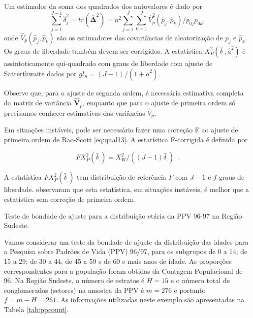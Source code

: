\documentclass[]{book}
\theoremstyle{definition}
\theoremstyle{definition}
\theoremstyle{definition}
\theoremstyle{remark}
\let\BeginKnitrBlock\begin \let\EndKnitrBlock\end
\begin{document}
Um estimador da soma dos quadrados dos autovalores é dado por \[
\sum_{j=1}^{J-1}\hat{\delta}_{j}^{2}=tr\left( \mathbf{\hat{\Delta}}^{2}\right) =n^{2}\sum\limits_{j=1}^{J}\sum\limits_{k=1}^{J}
\hat{V}_{p}^{2}\left( \hat{p}_{j},\hat{p}_{k}\right) /p_{0j}p_{0k}, 
\] onde \(\hat{V}_{p}\left( \hat{p}_{j},\hat{p}_{k}\right)\) são os
estimadores das covariâncias de aleatorização de \(\hat{p}_{j}\) e
\(\hat{p}_{k}\). Os graus de liberdade também devem ser corrigidos. A
estatística \(X_{P}^{2}\left( \hat{\delta}_{.},\hat{a}^{2}\right)\) é
assintoticamente qui-quadrado com graus de liberdade com ajuste de
Satterthwaite dados por
\(gl_{S}=\left( J-1\right) /\left( 1+\hat{a}^{2}\right)\).

Observe que, para o ajuste de segunda ordem, é necessária estimativa
completa da matriz de variância \(\mathbf{\hat{V}}_{p}\), enquanto que
para o ajuste de primeira ordem só precisamos conhecer estimativas das
variâncias \(\hat{V}_{p}\).

Em situações instáveis, pode ser necessário fazer uma correção F ao
ajuste de primeira ordem de Rao-Scott \eqref{eq:qual13}. A estatística
F-corrigida é definida por

\begin{equation}
FX_{P}^{2}\left( \hat{\delta}_{.}\right) =X_{W}^{2}/\left( \left( J-1\right) 
\hat{\delta}_{.}\right) \;\;.  
\label{eq:qual15}
\end{equation}

A estatística \(FX_{P}^{2}\left( \hat{\delta}_{.}\right)\) tem
distribuição de referência \(F\) com \(J-1\) e \(f\) graus de liberdade.
\citep{TR87} observaram que esta estatística, em situações instáveis, é
melhor que a estatística sem correção de primeira ordem.

\BeginKnitrBlock{example}
\protect\hypertarget{exm:exe71}{}{\label{exm:exe71} }Teste de bondade de
ajuste para a distribuição etária da PPV 96-97 na Região Sudeste.
\EndKnitrBlock{example}

Vamos considerar um teste da bondade de ajuste da distribuição das
idades para a Pesquisa sobre Padrões de Vida (PPV) 96/97, para os
subgrupos de 0 a 14; de 15 a 29; de 30 a 44; de 45 a 59 e de 60 e mais
anos de idade. As proporções correspondentes para a população foram
obtidas da Contagem Populacional de 96. Na Região Sudeste, o número de
estratos é \(H=15\) e o número total de conglomerados (setores) na
amostra da PPV é \(m=276\) e portanto \(f=m-H=261\). As informações
utilizadas neste exemplo são apresentadas na Tabela \ref{tab:ppcount}.
\end{document}
